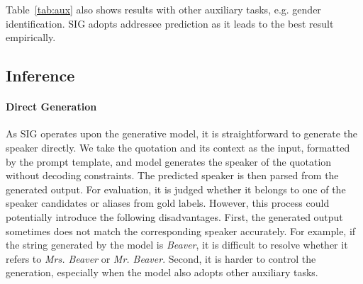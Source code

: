 \documentclass[letterpaper]{article} %
\begin{document}
Table~\ref{tab:aux} also shows results with other auxiliary tasks, e.g. gender identification. SIG adopts addressee prediction as it leads to the best result empirically.

\subsection{Inference}
\label{ssec:inference}

\paragraph{Direct Generation}
As SIG operates upon the generative model, it is straightforward to generate the speaker directly.
We take the quotation and its context as the input, formatted by the prompt template, and model generates the speaker of the quotation without decoding constraints.
The predicted speaker is then parsed from the generated output.
For evaluation, it is judged whether it belongs to one of the speaker candidates or aliases from gold labels.
However, this process could potentially introduce the following disadvantages. First, the generated output sometimes does not match the corresponding speaker accurately. For example, if the string generated by the model is \textit{Beaver}, it is difficult to resolve whether it refers to \textit{Mrs. Beaver} or \textit{Mr. Beaver}. Second, it is harder to control the generation, especially when the model also adopts other auxiliary tasks. %
\end{document}
